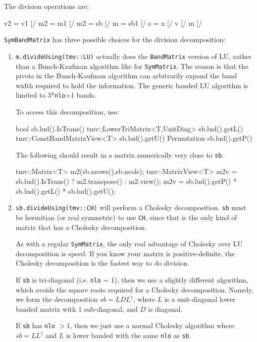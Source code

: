 \documentclass[twoside,letterpaper,11pt]{article}
\renewcommand{\tt}[1]{{\lstinline {#1}}}
\begin{document}
The division operations are:
\begin{tmvcode}
v2 = v1 [/%
m2 = m1 [/%
m2 = sb [/%
m = sb1 [/%
s = x [/%
v [/%
m [/%
\end{tmvcode}
\tt{SymBandMatrix} has three possible choices for the division decomposition:
\begin{enumerate}
\item
\tt{m.divideUsing(tmv::LU)} actually does the \tt{BandMatrix} version of 
LU, rather than a Bunch-Kaufman algorithm like for \tt{SymMatrix}.  The
reason is that the pivots in the Bunch-Kaufman algorithm can arbitrarily
expand the band width required to hold the information.  The generic
banded LU algorithm is limited to 3*\tt{nlo}+1 bands.

To access this decomposition, use:
\begin{tmvcode}
bool sb.lud().IsTrans()
tmv::LowerTriMatrix<T,UnitDiag> sb.lud().getL()
tmv::ConstBandMatrixView<T> sb.lud().getU()
Permutation sb.lud().getP()
\end{tmvcode}
The following should result in a matrix numerically very close to \tt{sb}.
\begin{tmvcode}
tmv::Matrix<T> m2(sb.nrows(),sb.ncols);
tmv::MatrixView<T> m2v = 
      sb.lud().IsTrans() ? m2.transpose() : m2.view();
m2v = sb.lud().getP() * sb.lud().getL() * sb.lud().getU();
\end{tmvcode}

\item
\tt{sb.divideUsing(tmv::CH)} will perform a Cholesky decomposition.  
\tt{sb} must be hermitian (or real symmetric) to use \tt{CH}, since that is the
only kind of matrix that has a Cholesky decomposition.  

As with a regular \tt{SymMatrix},
the only real advantage of Cholesky over LU decomposition is speed.  If you know your 
matrix is positive-definite, the Cholesky decomposition is the fastest way to 
do division.

If \tt{sb} is tri-diagonal (i.e. \tt{nlo} = 1), then we use a slightly 
different algorithm, which avoids the square roots required for a
Cholesky decomposition.  
Namely, we form the decomposition $sb = LDL^\dagger$, where $L$ is a
unit-diagonal lower banded matrix with 1 sub-diagonal, and $D$ is diagonal.

If \tt{sb} has \tt{nlo} $> 1$, then we just use a normal Cholesky algorithm
where $sb = LL^\dagger$ and $L$ is lower banded with the same \tt{nlo} as
\tt{sb}.


\end{enumerate}
\end{document}
